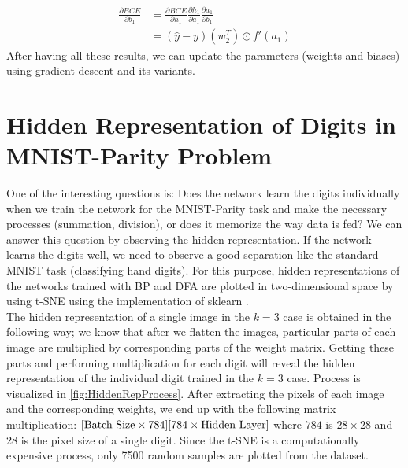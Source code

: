 \documentclass[a4paper, nobind]{templates/ociamthesis}
\begin{document}
\[
\begin{aligned} 
\frac{\partial BCE}{\partial b_{1}}&=\frac{\partial BCE}{\partial h_1} \frac{\partial h_1}{\partial a_{1}} \frac{\partial a_{1}}{\partial b_{1}} \\
&= \left(\hat{y}-y\right)\left(w_{2}^T\right) \odot f'(a_1)
\end{aligned}
\]
After having all these results, we can update the parameters (weights and biases) using gradient descent and its variants.

\hypertarget{hidden-representation-of-digits-in-mnist-parity-problem}{%
\chapter{Hidden Representation of Digits in MNIST-Parity Problem}\label{hidden-representation-of-digits-in-mnist-parity-problem}}

One of the interesting questions is: Does the network learn the digits individually when we train the network for the MNIST-Parity task and make the necessary processes (summation, division), or does it memorize the way data is fed? We can answer this question by observing the hidden representation. If the network learns the digits well, we need to observe a good separation like the standard MNIST task (classifying hand digits). For this purpose, hidden representations of the networks trained with BP and DFA are plotted in two-dimensional space by using t-SNE \cite{vanDerMaaten2008} using the implementation of sklearn \cite{scikit-learn}.\\
The hidden representation of a single image in the \(k=3\) case is obtained in the following way; we know that after we flatten the images, particular parts of each image are multiplied by corresponding parts of the weight matrix. Getting these parts and performing multiplication for each digit will reveal the hidden representation of the individual digit trained in the \(k=3\) case. Process is visualized in \ref{fig:HiddenRepProcess}. After extracting the pixels of each image and the corresponding weights, we end up with the following matrix multiplication: \([\text{Batch Size} \times 784] \dot [784 \space \times \space \text{Hidden Layer}]\) where \(784\) is \(28 \times 28\) and \(28\) is the pixel size of a single digit. Since the t-SNE is a computationally expensive process, only 7500 random samples are plotted from the dataset.
\end{document}
